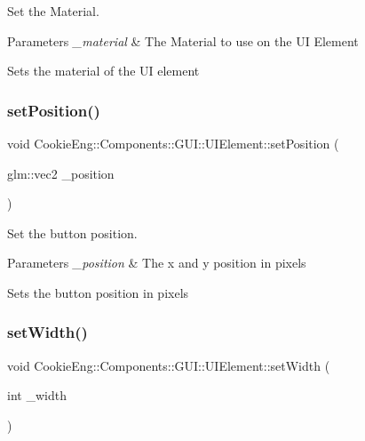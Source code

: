 Set the Material. 


\begin{DoxyParams}{Parameters}
{\em \+\_\+material} & The Material to use on the UI Element\\
\hline
\end{DoxyParams}
Sets the material of the UI element \mbox{\label{class_cookie_eng_1_1_components_1_1_g_u_i_1_1_u_i_element_ae491a0874fb7f77a4c1f83341b87f0fa}} 
\subsubsection{\texorpdfstring{set\+Position()}{setPosition()}}
{\footnotesize\ttfamily void Cookie\+Eng\+::\+Components\+::\+G\+U\+I\+::\+U\+I\+Element\+::set\+Position (\begin{DoxyParamCaption}\item[{glm\+::vec2}]{\+\_\+position }\end{DoxyParamCaption})}



Set the button position. 


\begin{DoxyParams}{Parameters}
{\em \+\_\+position} & The x and y position in pixels\\
\hline
\end{DoxyParams}
Sets the button position in pixels \mbox{\label{class_cookie_eng_1_1_components_1_1_g_u_i_1_1_u_i_element_a46bc04453a376a064875588280fa1df9}} 
\subsubsection{\texorpdfstring{set\+Width()}{setWidth()}}
{\footnotesize\ttfamily void Cookie\+Eng\+::\+Components\+::\+G\+U\+I\+::\+U\+I\+Element\+::set\+Width (\begin{DoxyParamCaption}\item[{int}]{\+\_\+width }\end{DoxyParamCaption})}



